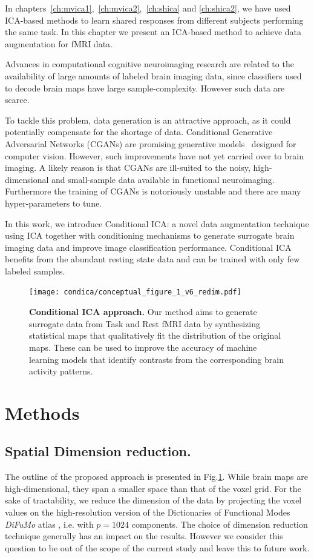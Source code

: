 In chapters~\ref{ch:mvica1},~\ref{ch:mvica2},~\ref{ch:shica} and
\ref{ch:shica2}, we have used ICA-based methods to learn shared responses from different
subjects performing the same task.
In this chapter we present an ICA-based method to achieve data augmentation for fMRI data.

  Advances in computational cognitive neuroimaging research are
  related to the availability of large amounts of labeled brain
imaging data, since classifiers used to decode brain maps have large
sample-complexity.
%
However such data are scarce.
%

To tackle this problem, data generation is an attractive approach, as
it could potentially compensate for the shortage of data.
Conditional Generative Adversarial Networks (CGANs) are promising generative
models~\cite{goodfellow2014generative} designed for computer vision.
% 
However, such improvements have not yet carried over to brain imaging. A likely
reason is that CGANs are ill-suited to the noisy, high-dimensional and
small-sample data available in functional neuroimaging. 
% 
Furthermore the training of CGANs is notoriously unstable and there are many hyper-parameters to tune.
% 

  In this work, we introduce Conditional ICA: a novel data augmentation technique using ICA together with conditioning mechanisms to generate surrogate brain imaging data and improve image classification performance.
  Conditional ICA benefits from the abundant
  resting state data and can be trained with only few labeled samples.


%
\begin{figure}
\centerline{\texttt{[image: condica/conceptual\_figure\_1\_v6\_redim.pdf]}}
\caption{\textbf{Conditional ICA approach.} Our method aims to
  generate surrogate data from Task and Rest fMRI data by synthesizing
  statistical maps that qualitatively fit the distribution of the
  original maps. These can be used to improve the accuracy of
  machine learning models that identify contrasts from the
  corresponding brain activity patterns.}
\label{Fig0}
\end{figure}



\section{Methods}

\subsection{Spatial Dimension reduction.} 
The outline of the proposed approach is presented in Fig.\ref{Fig0}.
%
While brain maps are high-dimensional, they span a smaller space than that of
the voxel grid. 
%
For the sake of tractability, we reduce the dimension of the data by projecting the voxel values on the
high-resolution version of the Dictionaries of Functional Modes \emph{DiFuMo}
atlas \cite{dadi_fine-grain_2020}, i.e. with $p=1024$ components.
%
The choice of dimension reduction technique generally has an impact on the
results. However we consider this question to be out of the scope of the current study and leave this to future work.

